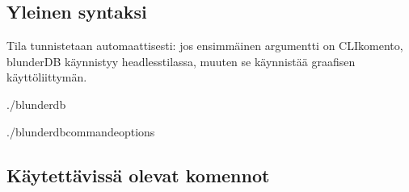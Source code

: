 \documentclass[letterpaper,10pt,finnish]{sphinxmanual}
\begin{document}
\subsection{Yleinen syntaksi}
\label{\detokenize{cli:syntaxe-generale}}
\sphinxAtStartPar
Tila tunnistetaan automaattisesti: jos ensimmäinen argumentti on CLI\sphinxhyphen{}komento, blunderDB käynnistyy headless\sphinxhyphen{}tilassa, muuten se käynnistää graafisen käyttöliittymän.

\begin{sphinxVerbatim}[commandchars=\\\{\}]
./blunderdb

./blunderdb\PYGZlt{}commande\PYGZgt{}\PYG{o}{[}options\PYG{o}{]}
\end{sphinxVerbatim}


\subsection{Käytettävissä olevat komennot}
\label{\detokenize{cli:commandes-disponibles}}
\end{document}
